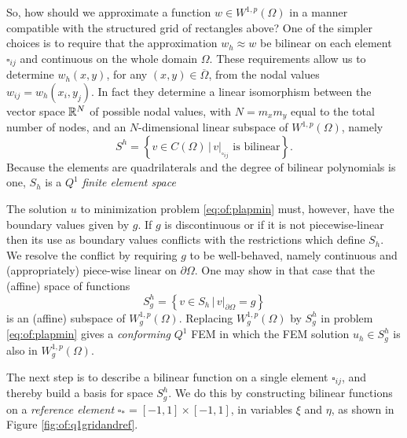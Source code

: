 So, how should we approximate a function $w \in W^{1,p}(\Omega)$ in a manner compatible with the structured grid of rectangles above?  One of the simpler choices is to require that the approximation $w_h \approx w$ be bilinear on each element $\square_{ij}$ and continuous on the whole domain $\Omega$.  These requirements allow us to determine $w_h(x,y)$, for any $(x,y)\in \overline\Omega$, from the nodal values $w_{ij} = w_h(x_i,y_j)$.  In fact they determine a linear isomorphism between the vector space $\mathbb{R}^N$ of possible nodal values, with $N=m_x m_y$ equal to the total number of nodes, and an $N$-dimensional linear subspace of $W^{1,p}(\Omega)$, namely
\begin{equation}
S^h = \left\{v \in C(\Omega) \, \Big| \, v|_{\square_{ij}} \text{ is bilinear}\right\}. \label{eq:of:Shdefn}
\end{equation}
Because the elements are quadrilaterals and the degree of bilinear polynomials is one, $S_h$ is a $Q^1$ \emph{finite element space} \citep{Elmanetal2005}

The solution $u$ to minimization problem \eqref{eq:of:plapmin} must, however, have the boundary values given by $g$.  If $g$ is discontinuous or if it is not piecewise-linear then its use as boundary values conflicts with the restrictions which define $S_h$.  We resolve the conflict by requiring $g$ to be well-behaved, namely continuous and (appropriately) piece-wise linear on $\partial\Omega$.  One may show in that case that the (affine) space of functions
\begin{equation}
S_g^h = \left\{v \in S_h \, \Big| \, v|_{\partial \Omega} = g\right\} \label{eq:of:Sghdefn}
\end{equation}
is an (affine) subspace of $W_g^{1,p}(\Omega)$.  Replacing $W_g^{1,p}(\Omega)$ by $S_g^h$ in problem \eqref{eq:of:plapmin} gives a \emph{conforming} $Q^1$ FEM in which the FEM solution $u_h\in S_g^h$ is also in $W_g^{1,p}(\Omega)$.

The next step is to describe a bilinear function on a single element $\square_{ij}$, and thereby build a basis for space $S_g^h$.  We do this by constructing bilinear functions on a \emph{reference element} $\square_\ast = [-1,1]\times[-1,1]$, in variables $\xi$ and $\eta$, as shown in Figure \ref{fig:of:q1gridandref}.

